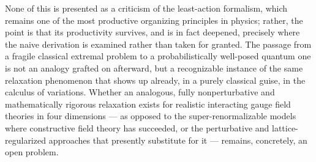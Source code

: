 None of this is presented as a criticism of the least-action formalism, which
remains one of the most productive organizing principles in physics; rather,
the point is that its productivity survives, and is in fact deepened, precisely
where the naive derivation is examined rather than taken for granted. The
passage from a fragile classical extremal problem to a probabilistically
well-posed quantum one is not an analogy grafted on afterward, but a
recognizable instance of the same relaxation phenomenon that shows up already,
in a purely classical guise, in the calculus of variations. Whether an
analogous, fully nonperturbative and mathematically rigorous relaxation exists
for realistic interacting gauge field theories in four dimensions --- as
opposed to the super-renormalizable models where constructive field theory has
succeeded, or the perturbative and lattice-regularized approaches that
presently substitute for it --- remains, concretely, an open problem.
